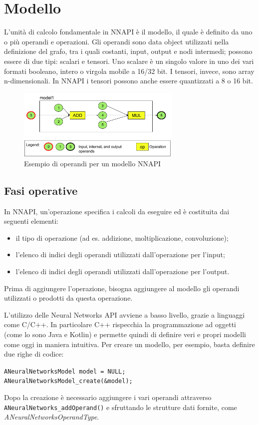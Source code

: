 \section{Modello}
L'unità di calcolo fondamentale in NNAPI è il modello, il quale è definito da uno o più operandi e operazioni.
Gli operandi sono data object utilizzati nella definizione del grafo, tra i quali costanti, input, output e nodi intermedi; possono essere di due tipi: scalari e tensori.
Uno scalare è un singolo valore in uno dei vari formati booleano, intero o virgola mobile a 16/32 bit.
I tensori, invece, sono array n-dimensionali. In NNAPI i tensori possono anche essere quantizzati a 8 o 16 bit.

\begin{figure}[ht]
    \centering
    \includegraphics[width=0.7\textwidth]{Immagini/operandi.png}
    \caption{Esempio di operandi per un modello NNAPI}
    \label{fig:operandi}    
\end{figure}

\subsection{Fasi operative}
In NNAPI, un'operazione specifica i calcoli da eseguire ed è costituita dai seguenti elementi:
\begin{itemize}
    \item il tipo di operazione (ad es. addizione, moltiplicazione, convoluzione);
    \item l'elenco di indici degli operandi utilizzati dall'operazione per l'input;
    \item l'elenco di indici degli operandi utilizzati dall'operazione per l'output.
\end{itemize}
Prima di aggiungere l'operazione, bisogna aggiungere al modello gli operandi utilizzati o prodotti da questa operazione.

L’utilizzo delle Neural Networks API avviene a basso livello, grazie a linguaggi come C/C++. In particolare C++ rispecchia la programmazione ad oggetti (come lo sono Java e Kotlin) e permette quindi di
definire veri e propri modelli come oggi in maniera intuitiva.
Per creare un modello, per esempio, basta definire due righe di codice:
\begin{center}
\texttt{ANeuralNetworksModel\* model = NULL;} \\ \texttt{ANeuralNetworksModel\_create(\&model);}\\
\end{center}
Dopo la creazione è necessario aggiungere i vari operandi attraverso \texttt{ANeuralNetworks\_addOperand()} e sfruttando le strutture dati fornite, come \textit{ANeuralNetworksOperandType}.

